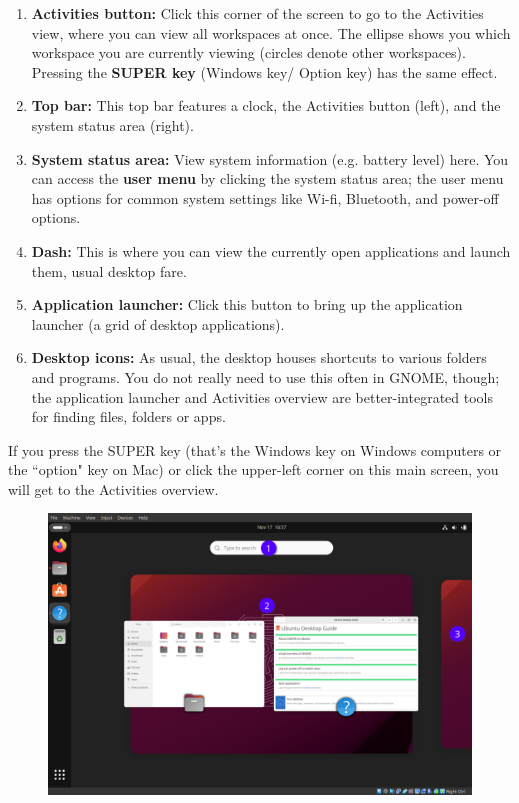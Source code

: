 \documentclass[12pt]{article}
\begin{document}
\begin{enumerate}
    \item \textbf{Activities button:} Click this corner of the screen to go to the Activities view, where you can view all workspaces at once. The ellipse shows you which workspace you are currently viewing (circles denote other workspaces). Pressing the \textbf{SUPER key} (Windows key/ Option key) has the same effect.
    \item \textbf{Top bar:} This top bar features a clock, the Activities button (left), and the system status area (right). 
    \item \textbf{System status area:} View system information (e.g. battery level) here. You can access the \textbf{user menu} by clicking the system status area; the user menu has options for common system settings like Wi-fi, Bluetooth, and power-off options.
    \item \textbf{Dash:} This is where you can view the currently open applications and launch them, usual desktop fare.
    \item \textbf{Application launcher:} Click this button to bring up the application launcher (a grid of desktop applications).
    \item \textbf{Desktop icons:} As usual, the desktop houses shortcuts to various folders and programs. You do not really need to use this often in GNOME, though; the application launcher and Activities overview are better-integrated tools for finding files, folders or apps.
\end{enumerate}

If you press the SUPER key (that's the Windows key on Windows computers or the ``option" key on Mac) or click the upper-left corner on this main screen, you will get to the Activities overview.

\begin{figure}[htp]
    \centering
    \includegraphics[width=\textwidth]{2-3.png}
\end{figure}
\end{document}
